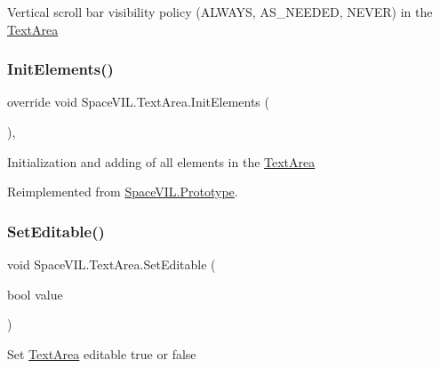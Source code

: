 Vertical scroll bar visibility policy (A\+L\+W\+A\+YS, A\+S\+\_\+\+N\+E\+E\+D\+ED, N\+E\+V\+ER) in the \mbox{\hyperlink{class_space_v_i_l_1_1_text_area}{Text\+Area}} 

\mbox{\label{class_space_v_i_l_1_1_text_area_a1d7971411658c81ed831c91958df7ade}} 
\subsubsection{\texorpdfstring{Init\+Elements()}{InitElements()}}
{\footnotesize\ttfamily override void Space\+V\+I\+L.\+Text\+Area.\+Init\+Elements (\begin{DoxyParamCaption}{ }\end{DoxyParamCaption})\hspace{0.3cm}{\ttfamily [inline]}, {\ttfamily [virtual]}}



Initialization and adding of all elements in the \mbox{\hyperlink{class_space_v_i_l_1_1_text_area}{Text\+Area}} 



Reimplemented from \mbox{\hyperlink{class_space_v_i_l_1_1_prototype_ac3379fe02923ee155b5b0084abf27420}{Space\+V\+I\+L.\+Prototype}}.

\mbox{\label{class_space_v_i_l_1_1_text_area_aace48f2c2e10b98336dc0a06d85e3b9f}} 
\subsubsection{\texorpdfstring{Set\+Editable()}{SetEditable()}}
{\footnotesize\ttfamily void Space\+V\+I\+L.\+Text\+Area.\+Set\+Editable (\begin{DoxyParamCaption}\item[{bool}]{value }\end{DoxyParamCaption})\hspace{0.3cm}{\ttfamily [inline]}}



Set \mbox{\hyperlink{class_space_v_i_l_1_1_text_area}{Text\+Area}} editable true or false 

